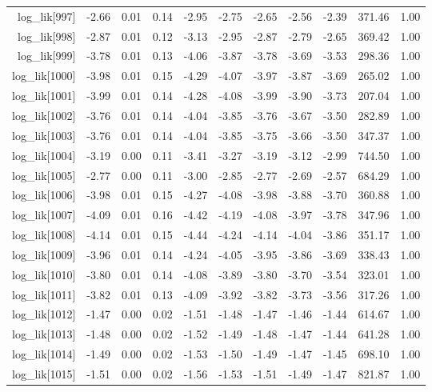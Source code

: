 \begin{table}[ht]
\begin{tabular}{rrrrrrrrrrr}
  log\_lik[997] & -2.66 & 0.01 & 0.14 & -2.95 & -2.75 & -2.65 & -2.56 & -2.39 & 371.46 & 1.00 \\ 
  log\_lik[998] & -2.87 & 0.01 & 0.12 & -3.13 & -2.95 & -2.87 & -2.79 & -2.65 & 369.42 & 1.00 \\ 
  log\_lik[999] & -3.78 & 0.01 & 0.13 & -4.06 & -3.87 & -3.78 & -3.69 & -3.53 & 298.36 & 1.00 \\ 
  log\_lik[1000] & -3.98 & 0.01 & 0.15 & -4.29 & -4.07 & -3.97 & -3.87 & -3.69 & 265.02 & 1.00 \\ 
  log\_lik[1001] & -3.99 & 0.01 & 0.14 & -4.28 & -4.08 & -3.99 & -3.90 & -3.73 & 207.04 & 1.00 \\ 
  log\_lik[1002] & -3.76 & 0.01 & 0.14 & -4.04 & -3.85 & -3.76 & -3.67 & -3.50 & 282.89 & 1.00 \\ 
  log\_lik[1003] & -3.76 & 0.01 & 0.14 & -4.04 & -3.85 & -3.75 & -3.66 & -3.50 & 347.37 & 1.00 \\ 
  log\_lik[1004] & -3.19 & 0.00 & 0.11 & -3.41 & -3.27 & -3.19 & -3.12 & -2.99 & 744.50 & 1.00 \\ 
  log\_lik[1005] & -2.77 & 0.00 & 0.11 & -3.00 & -2.85 & -2.77 & -2.69 & -2.57 & 684.29 & 1.00 \\ 
  log\_lik[1006] & -3.98 & 0.01 & 0.15 & -4.27 & -4.08 & -3.98 & -3.88 & -3.70 & 360.88 & 1.00 \\ 
  log\_lik[1007] & -4.09 & 0.01 & 0.16 & -4.42 & -4.19 & -4.08 & -3.97 & -3.78 & 347.96 & 1.00 \\ 
  log\_lik[1008] & -4.14 & 0.01 & 0.15 & -4.44 & -4.24 & -4.14 & -4.04 & -3.86 & 351.17 & 1.00 \\ 
  log\_lik[1009] & -3.96 & 0.01 & 0.14 & -4.24 & -4.05 & -3.95 & -3.86 & -3.69 & 338.43 & 1.00 \\ 
  log\_lik[1010] & -3.80 & 0.01 & 0.14 & -4.08 & -3.89 & -3.80 & -3.70 & -3.54 & 323.01 & 1.00 \\ 
  log\_lik[1011] & -3.82 & 0.01 & 0.13 & -4.09 & -3.92 & -3.82 & -3.73 & -3.56 & 317.26 & 1.00 \\ 
  log\_lik[1012] & -1.47 & 0.00 & 0.02 & -1.51 & -1.48 & -1.47 & -1.46 & -1.44 & 614.67 & 1.00 \\ 
  log\_lik[1013] & -1.48 & 0.00 & 0.02 & -1.52 & -1.49 & -1.48 & -1.47 & -1.44 & 641.28 & 1.00 \\ 
  log\_lik[1014] & -1.49 & 0.00 & 0.02 & -1.53 & -1.50 & -1.49 & -1.47 & -1.45 & 698.10 & 1.00 \\ 
  log\_lik[1015] & -1.51 & 0.00 & 0.02 & -1.56 & -1.53 & -1.51 & -1.49 & -1.47 & 821.87 & 1.00 \\ 

\end{tabular}
\end{table}
